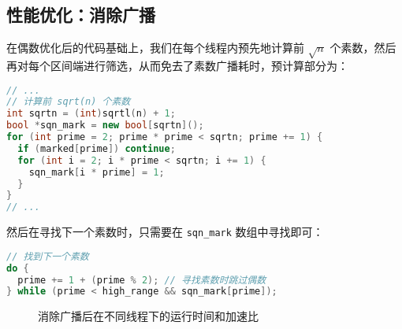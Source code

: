 \documentclass[11pt]{article}
\begin{document}
  \subsection{性能优化：消除广播}
  在偶数优化后的代码基础上，我们在每个线程内预先地计算前 $\sqrt{n}$ 个素数，然后再对每个区间端进行筛选，从而免去了素数广播耗时，预计算部分为：
  \begin{file}
    \begin{lstlisting}[language=C++]
// ...
// 计算前 sqrt(n) 个素数
int sqrtn = (int)sqrtl(n) + 1;
bool *sqn_mark = new bool[sqrtn]();
for (int prime = 2; prime * prime < sqrtn; prime += 1) {
  if (marked[prime]) continue;
  for (int i = 2; i * prime < sqrtn; i += 1) {
    sqn_mark[i * prime] = 1;
  }
}
// ...
    \end{lstlisting}
  \end{file}
  然后在寻找下一个素数时，只需要在 \verb|sqn_mark| 数组中寻找即可：
  \begin{file}
    \begin{lstlisting}[language=C++]
// 找到下一个素数
do {
  prime += 1 + (prime % 2); // 寻找素数时跳过偶数
} while (prime < high_range && sqn_mark[prime]);
    \end{lstlisting}
  \end{file}
  \begin{figure}[h]
    \centering
    \caption{消除广播后在不同线程下的运行时间和加速比}
    \label{fig:no_cast}
  \end{figure}
\end{document}
